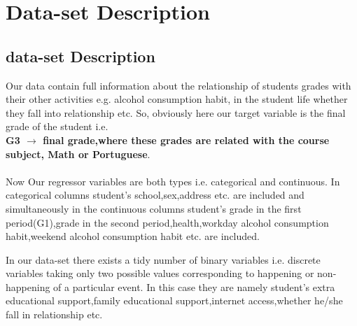 \documentclass[A4paper,11pt]{report}
\begin{document}
	
	
	\section{Data-set Description}
	\subsection{data-set Description} Our data contain full information about the relationship of students grades with their other activities e.g. alcohol consumption habit, in the student life whether they fall into relationship etc. So, obviously here our target variable is the final grade of the student i.e.\\
	\textbf{G3 $\rightarrow$ final grade,where these grades are related with the course subject, Math or Portuguese}.
	 
	
	\vspace{-0.5 cm}\paragraph{}Now Our regressor variables are both types i.e. categorical and continuous. In categorical columns student's school,sex,address etc. are included and simultaneously in the continuous columns student's grade in the first period(G1),grade in the second period,health,workday alcohol consumption habit,weekend alcohol consumption habit etc. are included.\\
	\vspace{-0.5 cm}\par In our data-set there exists a tidy number of binary variables i.e. discrete variables taking only two possible values corresponding to happening or non-happening of a particular event. In this case they are namely student's extra educational support,family educational support,internet access,whether he/she fall in relationship etc.
	
\end{document}
